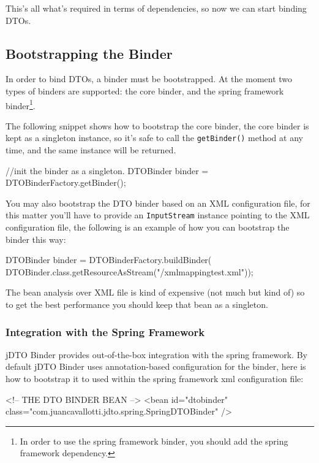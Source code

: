 \documentclass[11pt]{article}
\newcommand{\JDTO}{jDTO Binder\xspace}
\begin{document}
This's all what's required in terms of dependencies, so now we can start binding DTOs.

\subsection{Bootstrapping the Binder}


In order to bind DTOs, a binder must be bootstrapped. At the moment two types of binders
are supported: the core binder, and the spring framework binder\footnote{In order to use the spring framework binder, you should add the spring framework dependency.}.


The following snippet shows how to bootstrap the core binder, the core binder is kept as a singleton instance, so it's safe to call the \texttt{getBinder()} method at any time, and the same instance will be returned.


\begin{java}
//init the binder as a singleton.
DTOBinder binder = DTOBinderFactory.getBinder();
\end{java}

You may also bootstrap the DTO binder based on an XML configuration file, for this matter you'll have to provide an \texttt{InputStream} instance pointing to the XML configuration file, the following is an example of how you can bootstrap the binder this way:


\begin{java}
DTOBinder binder = DTOBinderFactory.buildBinder(
    DTOBinder.class.getResourceAsStream("/xmlmappingtest.xml"));
\end{java}

The bean analysis over XML file is kind of expensive (not much but kind of) so to get the best performance you should keep that bean as a singleton.

\subsubsection{Integration with the Spring Framework}

\JDTO provides out-of-the-box integration with the spring framework. By default \JDTO uses annotation-based configuration for the binder, here is how to bootstrap it to used within the spring framework xml configuration file:


\begin{xml}
<!-- THE DTO BINDER BEAN --> 
<bean id="dtobinder" 
    class="com.juancavallotti.jdto.spring.SpringDTOBinder" />
\end{xml}
\end{document}
